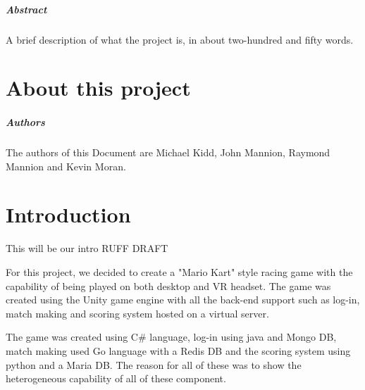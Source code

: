 
\paragraph{Abstract}
A brief description of what the project is, in about two-hundred and fifty words.

\chapter*{About this project}

\paragraph{Authors}
The authors of this Document are Michael Kidd, John Mannion, Raymond Mannion and Kevin Moran.

\chapter{Introduction}
This will be our intro RUFF DRAFT


For this project, we decided to create a "Mario Kart" style racing game 
with the capability of being played on both desktop and VR headset. The game was created using the Unity game engine with all the back-end support such as log-in, match making and scoring system hosted on a virtual server.

The game was created using C# language, log-in using java and Mongo DB,
match making used Go language with a Redis DB and the scoring system using python and a Maria DB. The reason for all of these was to show the heterogeneous capability of all of these component.

